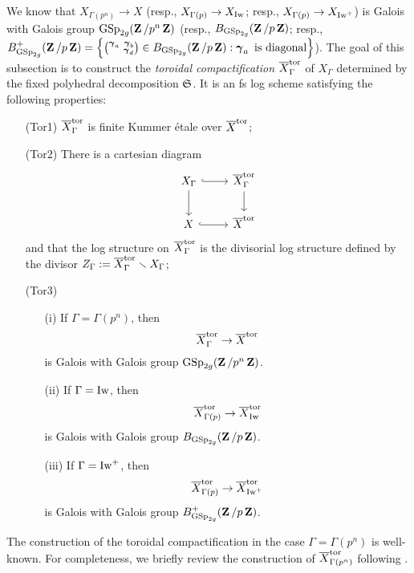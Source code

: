 We know that $X_{\Gamma(p^n)} \rightarrow X$ (resp., $X_{\Gamma(p)} \rightarrow X_{\operatorname{Iw}}$; resp., $X_{\Gamma(p)} \rightarrow X_{\operatorname{Iw}^+}$) is Galois with Galois group $\operatorname{GSp}_{2g}(\operatorname{\mathbf{Z}}/p^n\operatorname{\mathbf{Z}})$ (resp., $B_{\operatorname{GSp}_{2g}}(\operatorname{\mathbf{Z}}/p\operatorname{\mathbf{Z}})$; resp., $B_{\operatorname{GSp}_{2g}}^+(\operatorname{\mathbf{Z}}/p\operatorname{\mathbf{Z}}) = \left\{ \left(\substack{\operatorname{\boldsymbol{\gamma}}_a \,\, \operatorname{\boldsymbol{\gamma}}_b\\ \quad \,\, \operatorname{\boldsymbol{\gamma}}_d}\right)\in B_{\operatorname{GSp}_{2g}}(\operatorname{\mathbf{Z}}/p\operatorname{\mathbf{Z}}): \operatorname{\boldsymbol{\gamma}}_a \text{ is diagonal}\right\}$). The goal of this subsection is to construct the \emph{toroidal compactification} $\overline{X}^{\operatorname{tor}}_{\Gamma}$ of $X_{\Gamma}$ determined by the fixed polyhedral decomposition $\operatorname{\mathfrak{S}}$. It is an fs log scheme satisfying the following properties:
\begin{enumerate}
    \item[(Tor1)] $\overline{X}^{\operatorname{tor}}_{\Gamma}$ is finite Kummer \'etale over $\overline{X}^{\operatorname{tor}}$; 
    \item[(Tor2)] There is a cartesian diagram \[
        \begin{tikzcd}
            X_{\Gamma} \arrow[r, hook]\arrow[d] & \overline{X}^{\tor}_{\Gamma}\arrow[d]\\
            X\arrow[r, hook] & \overline{X}^{\tor}
        \end{tikzcd}
    \] and that the log structure on $\overline{X}^{\operatorname{tor}}_{\Gamma}$ is the divisorial log structure defined by the divisor $Z_{\Gamma}:=\overline{X}^{\operatorname{tor}}_{\Gamma}\smallsetminus X_{\Gamma}$;
    \item[(Tor3)] \begin{enumerate}
        \item[(i)] If $\Gamma = \Gamma(p^n)$, then \[
            \overline{X}^{\operatorname{tor}}_{\Gamma} \rightarrow \overline{X}^{\operatorname{tor}}
        \] is Galois with Galois group $\operatorname{GSp}_{2g}(\operatorname{\mathbf{Z}}/p^n\operatorname{\mathbf{Z}})$. 
        \item[(ii)] If $\Gamma = \operatorname{Iw}$, then \[
            \overline{X}^{\operatorname{tor}}_{\Gamma(p)} \rightarrow \overline{X}^{\operatorname{tor}}_{\operatorname{Iw}}
        \] is Galois with Galois group $B_{\operatorname{GSp}_{2g}}(\operatorname{\mathbf{Z}}/p\operatorname{\mathbf{Z}})$. 
        \item[(iii)] If $\Gamma = \operatorname{Iw}^+$, then \[
            \overline{X}^{\operatorname{tor}}_{\Gamma(p)} \rightarrow \overline{X}^{\operatorname{tor}}_{\operatorname{Iw}^+}
        \] is Galois with Galois group $B^+_{\operatorname{GSp}_{2g}}(\operatorname{\mathbf{Z}}/p\operatorname{\mathbf{Z}})$.
    \end{enumerate}
\end{enumerate}

The construction of the toroidal compactification in the case $\Gamma=\Gamma(p^n)$ is well-known. For completeness, we briefly review the construction of $\overline{X}_{\Gamma(p^n)}^{\operatorname{tor}}$ following \cite{Pilloni-Stroh-CoherentCohomologyandGaloisRepresentations}.

